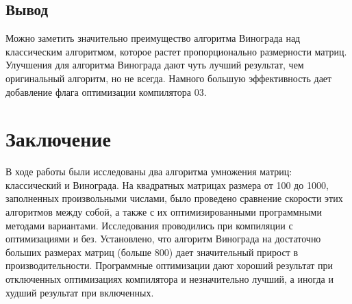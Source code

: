 \documentclass[a4paper, 14pt]{article}
\begin{document}
	
	
	\newpage
	\subsection{Вывод}
	
	Можно заметить значительно преимущество алгоритма Винограда над классическим алгоритмом, которое растет пропорционально размерности матриц. Улучшения для алгоритма Винограда дают чуть лучший результат, чем оригинальный алгоритм, но не всегда.
	Намного большую эффективность дает добавление флага оптимизации компилятора 03.
	
	
	\newpage
	\section*{Заключение}
	
	В ходе работы были исследованы два алгоритма умножения матриц: классический и Винограда. На квадратных матрицах размера от 100 до 1000, заполненных произвольными числами, было проведено сравнение скорости этих алгоритмов между собой, а также с их оптимизированными программными методами вариантами. Исследования проводились при компиляции с оптимизациями и без. Установлено, что алгоритм Винограда на достаточно больших размерах матриц (больше 800) дает значительный прирост в производительности. Программные оптимизации дают хороший результат при отключенных оптимизациях компилятора и незначительно лучший, а иногда и худший результат при включенных.
	
\end{document}
